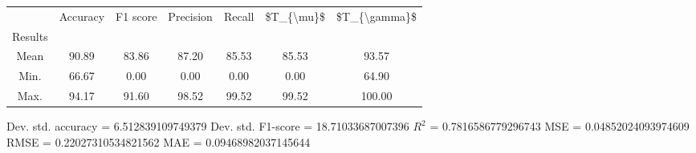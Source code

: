 \begin{tabular}{|c|c|c|c|c|c|c|}
\toprule
{} &  Accuracy &  F1 score &  Precision &  Recall &  \$T\_\{\textbackslash mu\}\$ &  \$T\_\{\textbackslash gamma\}\$ \\
Results &           &           &            &         &            &               \\
\hline
Mean    &     90.89 &     83.86 &      87.20 &   85.53 &      85.53 &         93.57 \\
Min.    &     66.67 &      0.00 &       0.00 &    0.00 &       0.00 &         64.90 \\
Max.    &     94.17 &     91.60 &      98.52 &   99.52 &      99.52 &        100.00 \\
\bottomrule
\end{tabular}

 Dev. std. accuracy = 6.512839109749379
 Dev. std. F1-score = 18.71033687007396
 $R^2$ = 0.7816586779296743
 MSE = 0.04852024093974609
 RMSE = 0.22027310534821562
 MAE = 0.09468982037145644